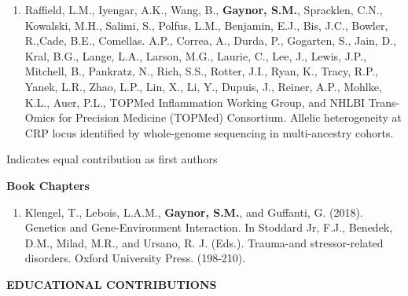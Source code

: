 \documentclass[10pt]{article}
\begin{document}
\begin{enumerate}
\item Raffield, L.M.,  Iyengar, A.K.,  Wang, B.,  \textbf{Gaynor, S.M.}, Spracklen, C.N., Kowalski, M.H., Salimi, S., Polfus, L.M., Benjamin, E.J., Bis, J.C., Bowler, R.,Cade, B.E., Comellas. A.P.,  Correa, A.,  Durda, P.,  Gogarten, S.,  Jain, D., Kral, B.G., Lange, L.A.,  Larson, M.G.,  Laurie, C., Lee, J., Lewis, J.P., Mitchell, B.,  Pankratz, N.,  Rich, S.S., Rotter, J.I., Ryan, K., Tracy, R.P., Yanek, L.R.,  Zhao, L.P., Lin, X., Li, Y., Dupuis, J., Reiner, A.P., Mohlke, K.L., Auer, P.L., TOPMed Inflammation Working Group, and NHLBI Trans-Omics for Precision Medicine (TOPMed) Consortium. Allelic heterogeneity at CRP locus identified by whole-genome sequencing in multi-ancestry cohorts.\\
\end{enumerate}

\indent \indent  * Indicates equal contribution as first authors\\

\pagebreak

\indent \textbf{Book Chapters} \\
\begin{enumerate}
	\item Klengel, T., Lebois, L.A.M., \textbf{Gaynor, S.M.}, and Guffanti, G. (2018). Genetics and Gene-Environment Interaction. In Stoddard Jr, F.J.,
Benedek, D.M., Milad, M.R., and Ursano, R. J. (Eds.). Trauma-and stressor-related disorders. Oxford University Press. (198-210).\\
\end{enumerate}

\vspace{0.cm}

{\bf  EDUCATIONAL CONTRIBUTIONS} \hrulefill \\
\end{document}
